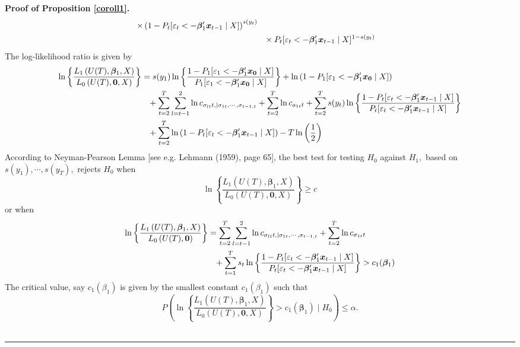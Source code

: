 \documentclass[harvard,11pt]{article}
\newenvironment{proof}[1][Proof]{\textbf{#1.} }{\  \rule{0.5em}{0.5em}}
\begin{document}
\begin{proof}[Proof of Proposition \protect\ref{coroll1}]
\begin{align*}
\times \left(1-P_t[\varepsilon_t< -\bm{\beta}_1'\bm{x}_{t-1}\mid X]\right)^{s(y_t)}\\
&\textcolor{white}{=}\times P_t[\varepsilon_t < -\bm{\beta}_1' \bm{x}_{t-1}\mid X]^{1-s(y_t)}
\end{align*}
\endgroup
The log-likelihood ratio is given by%
\begingroup
\allowdisplaybreaks
\begin{align*}
\ln \left\{ \frac{L_1\left( U(T),\bm{\beta} _{1},X\right) }{L
_{0}\left( U(T),\bm{0},X\right) }\right\}&=s(y_1)\ln\left\{\frac{1-P_1[\varepsilon_1<-\bm{\beta}_1' \bm{x_0}\mid X ]}{P_1[\varepsilon_1 < -\bm{\beta}_1'\bm{x_0}\mid X]}\right\}+\ln \left(1-P_1[\varepsilon_1< -\bm{\beta}_1' \bm{x_0}\mid X]\right)\\
&\textcolor{white}{=}+\sum\limits_{t=2}^{T}\sum\limits_{l=t-1}^{2}\ln c_{\sigma_{lt}t,\mid \sigma_{1t},\cdots,\sigma_{t-1,t}}+\sum\limits_{t=2}^{T}\ln c_{a_{1t}t}+\sum\limits_{t=2}^{T}s(y_t)\ln\left\{\frac{1-P_t[\varepsilon_t<- \bm{\beta}_1' \bm{x}_{t-1}\mid X]}{P_t[\varepsilon_t <-\bm{\beta}_1' \bm{x}_{t-1}\mid X]}\right\}\\
&\textcolor{white}{=}+\sum\limits_{t=2}^{T}\ln\left(1- P_t[\varepsilon_t< -\bm{\beta}_1'\bm{x}_{t-1}\mid X]\right)-T\ln\left(\frac{1}{2}\right)
\end{align*}
\endgroup
According to Neyman-Pearson Lemma [see e.g. Lehmann (1959), page 65], the
best test for testing $H_{0}$ against $H_1,$ based on $s(y_{1}),\cdots,s(y_{T}),$
rejects $H_{0}$ when%
\begin{equation*}
\ln \left\{ \frac{L_1\left( U(T),\bm{\beta} _{1},X\right) }{L_{0}\left( U(T),\bm{0},X\right) }\right\} \geq c
\end{equation*}%
or when%
\begingroup
\allowdisplaybreaks
\begin{align*}
\ln \left\{ \frac{L_1\left( U(T),\bm{\beta} _{1},X\right) }{L
_{0}\left( U(T),\bm{0}\right) }\right\}&=\sum\limits_{t=2}^{T}\sum\limits_{l=t-1}^{2}\ln c_{\sigma_{lt}t,\mid \sigma_{1t},\cdots,\sigma_{t-1,t}}+\sum\limits_{t=2}^{T}\ln c_{\sigma_{1t}t}\\\
&\textcolor{white}{=}+\sum\limits_{t=1}^{T}s_t\ln\left\{\frac{1-P_t[\varepsilon_t<-\bm{\beta}_1' \bm{x}_{t-1}\mid X]}{P_t[\varepsilon_t< -\bm{\beta}_1' \bm{x}_{t-1}\mid X]}\right\}>c_1(\bm{\beta}_1)
\end{align*}
\endgroup
The critical value, say $c_1(\beta_1)$ is given by the smallest constant $c_1(\beta_1)$ such that%
\begin{equation*}
P\left( \ln \left\{ \frac{L_1\left( U(T),\bm{\beta}_{1},X\right) }{L_{0}\left( U(T),\bm{0},X\right) }\right\} >c_1(\bm{\beta}_1)\mid
H_{0}\right) \leq \alpha .
\end{equation*}
\end{proof}
\end{document}
